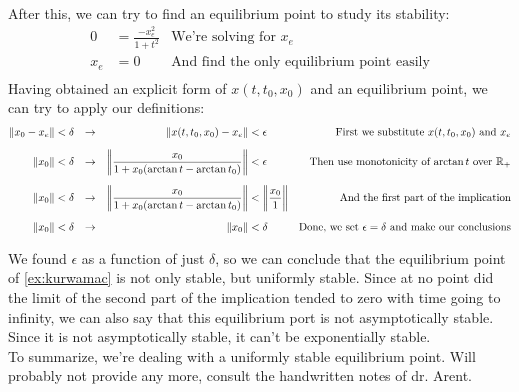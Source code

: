 {\begin{equation}
\begin{aligned}
    \end{aligned}
    \end{equation}
    After this, we can try to find an equilibrium point to study its stability:
    \begin{align*}
       0&=\frac{-x_e^{2}}{1+t^{2}}&\mbox{We're solving for $x_e$}\\[1.25ex]
       x_e&=0&\mbox{And find the only equilibrium point easily}\\[1.25ex]
    \end{align*}
    Having obtained an explicit form of $x(t,t_0,x_0)$ and an equilibrium point, we can try to apply our definitions:
    \begin{align*}
        \norm{x_0-x_e} &<\delta &\rightarrow&& \norm{x(t,t_0,x_0) - x_e} &< \epsilon&\mbox{First we substitute $x(t,t_0,x_0)$ and $x_e$}\\[1.25ex]
    \norm{x_0} &< \delta &\rightarrow&& \norm[\bigg]{\frac{x_0}{1+x_0(\arctan{t}-\arctan{t_0})}}&<\epsilon&\mbox{Then use monotonicity of $\arctan{t}$ over $\mathbb{R}_+$}\\[1.25ex]
\norm{x_0} &<\delta&\rightarrow && \norm[\bigg]{\frac{x_0}{1+x_0(\arctan{t}-\arctan{t_0})}}&< \norm[\bigg]{\frac{x_0}{1}} & \mbox{And the first part of the implication}\\[1.25ex]
\norm{x_0} &<\delta&\rightarrow && \norm{x_0}&< \delta & \mbox{Done, we set $\epsilon = \delta$ and make our conclusions}\\[1.25ex]
    \end{align*}
We found $\epsilon$ as a function of just $\delta$, so we can conclude that the equilibrium point of  \ref{ex:kurwamac} is not only stable, but uniformly stable. Since at no point did the limit of the second part of the implication tended to zero with time going to infinity, we can also say that this equilibrium port is not asymptotically stable. Since it is not asymptotically stable, it can't be exponentially stable.\\
To summarize, we're dealing with a uniformly stable equilibrium point.
}
Will probably not provide any more, consult the handwritten notes of dr. Arent.
\clearpage

